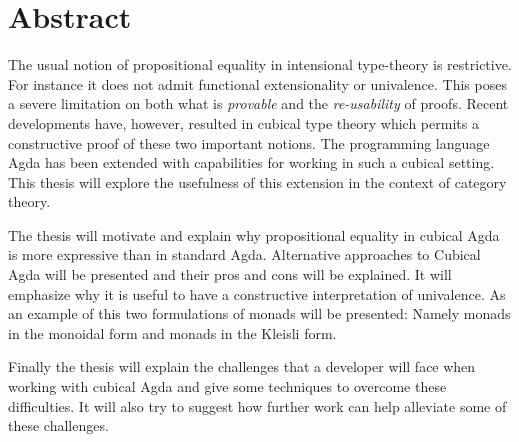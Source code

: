 \chapter*{Abstract}
The usual notion of propositional equality in intensional type-theory
is restrictive. For instance it does not admit functional
extensionality or univalence. This poses a severe limitation on both
what is \emph{provable} and the \emph{re-usability} of proofs. Recent
developments have, however, resulted in cubical type theory which
permits a constructive proof of these two important notions. The
programming language Agda has been extended with capabilities for
working in such a cubical setting. This thesis will explore the
usefulness of this extension in the context of category theory.

The thesis will motivate and explain why propositional equality in
cubical Agda is more expressive than in standard Agda. Alternative
approaches to Cubical Agda will be presented and their pros and cons
will be explained. It will emphasize why it is useful to have a
constructive interpretation of univalence. As an example of this two
formulations of monads will be presented: Namely monads in the
monoidal form and monads in the Kleisli form.

Finally the thesis will explain the challenges that a developer will
face when working with cubical Agda and give some techniques to
overcome these difficulties. It will also try to suggest how further
work can help alleviate some of these challenges.

